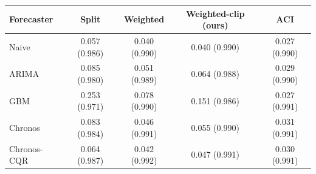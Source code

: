 \begin{tabular}{lcccc}
\toprule
Forecaster & Split & Weighted & Weighted-clip (ours) & ACI \\
\midrule
Naive & 0.057 (0.986) & 0.040 (0.990) & 0.040 (0.990) & 0.027 (0.990) \\
ARIMA & 0.085 (0.980) & 0.051 (0.989) & 0.064 (0.988) & 0.029 (0.990) \\
GBM & 0.253 (0.971) & 0.078 (0.990) & 0.151 (0.986) & 0.027 (0.991) \\
Chronos & 0.083 (0.984) & 0.046 (0.991) & 0.055 (0.990) & 0.031 (0.991) \\
Chronos-CQR & 0.064 (0.987) & 0.042 (0.992) & 0.047 (0.991) & 0.030 (0.991) \\
\bottomrule
\end{tabular}
